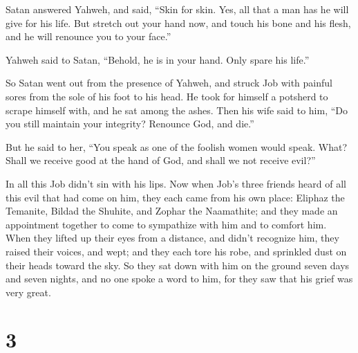  Satan answered Yahweh, and said, ``Skin for skin. Yes,
all that a man has he will give for his life.  But stretch
out your hand now, and touch his bone and his flesh, and he will
renounce you to your face.''

 Yahweh said to Satan, ``Behold, he is in your hand. Only
spare his life.''

 So Satan went out from the presence of Yahweh, and struck
Job with painful sores from the sole of his foot to his head.
 He took for himself a potsherd to scrape himself with,
and he sat among the ashes.  Then his wife said to him,
``Do you still maintain your integrity? Renounce God, and die.''

 But he said to her, ``You speak as one of the foolish
women would speak. What? Shall we receive good at the hand of God, and
shall we not receive evil?''

In all this Job didn't sin with his lips.  Now when Job's
three friends heard of all this evil that had come on him, they each
came from his own place: Eliphaz the Temanite, Bildad the Shuhite, and
Zophar the Naamathite; and they made an appointment together to come to
sympathize with him and to comfort him.  When they lifted
up their eyes from a distance, and didn't recognize him, they raised
their voices, and wept; and they each tore his robe, and sprinkled dust
on their heads toward the sky.  So they sat down with him
on the ground seven days and seven nights, and no one spoke a word to
him, for they saw that his grief was very great.

\hypertarget{section-2}{%
\section{3}\label{section-2}}

